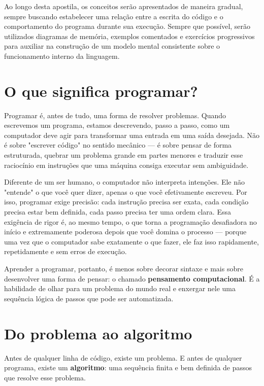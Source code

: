 Ao longo desta apostila, os conceitos serão apresentados de maneira gradual, sempre buscando estabelecer uma relação entre a escrita do código e o comportamento do programa durante sua execução. 
Sempre que possível, serão utilizados diagramas de memória, exemplos comentados e exercícios progressivos para auxiliar na construção de um modelo mental consistente sobre o funcionamento interno da linguagem.


\section{O que significa programar?}

Programar é, antes de tudo, uma forma de resolver problemas. Quando escrevemos um programa, estamos descrevendo, passo a passo, como um computador deve agir para transformar uma entrada em uma saída desejada. Não é sobre "escrever código" no sentido mecânico — é sobre pensar de forma estruturada, quebrar um problema grande em partes menores e traduzir esse raciocínio em instruções que uma máquina consiga executar sem ambiguidade.

Diferente de um ser humano, o computador não interpreta intenções. Ele não "entende" o que você quer dizer, apenas o que você efetivamente escreveu. Por isso, programar exige precisão: cada instrução precisa ser exata, cada condição precisa estar bem definida, cada passo precisa ter uma ordem clara. Essa exigência de rigor é, ao mesmo tempo, o que torna a programação desafiadora no início e extremamente poderosa depois que você domina o processo — porque uma vez que o computador sabe exatamente o que fazer, ele faz isso rapidamente, repetidamente e sem erros de execução.

Aprender a programar, portanto, é menos sobre decorar sintaxe e mais sobre desenvolver uma forma de pensar: o chamado \textbf{pensamento computacional}. É a habilidade de olhar para um problema do mundo real e enxergar nele uma sequência lógica de passos que pode ser automatizada.



\section{Do problema ao algoritmo}

Antes de qualquer linha de código, existe um problema. E antes de qualquer programa, existe um \textbf{algoritmo}: uma sequência finita e bem definida de passos que resolve esse problema.

